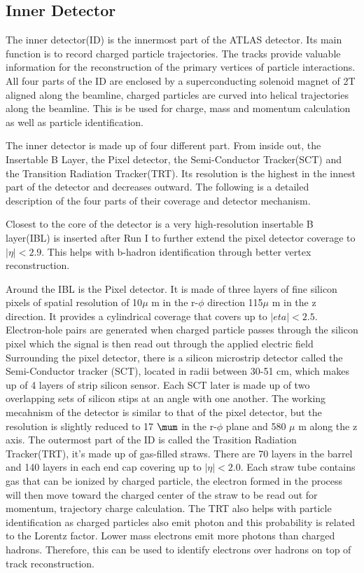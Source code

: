\subsection{Inner Detector}
The inner detector(ID) is the innermost part of the ATLAS detector. Its main function is to record charged particle trajectories. The tracks provide valuable information for the reconstruction of the primary vertices of particle interactions. All four parts of the ID are enclosed by a superconducting solenoid magnet of 2T aligned along the beamline, charged particles are curved into helical trajectories along the beamline. This is be used for charge, mass and momentum calculation as well as particle
identification. 



The inner detector is made up of four different part. From inside out, the Insertable B Layer, the Pixel detector, the Semi-Conductor Tracker(SCT) and the Transition Radiation Tracker(TRT). 
Its resolution is the highest in the innest part of the detector and decreases outward. The following is a detailed description of the four parts of their coverage and detector mechanism. 

Closest to the core of the detector is a very high-resolution insertable B layer(IBL) is inserted after Run I to further extend the pixel detector coverage to $|\eta|< 2.9$. This helps with b-hadron identification through better vertex reconstruction.

Around the IBL is the Pixel detector. It is made of three layers of fine silicon pixels of spatial resolution of 10$\mu$ m in the r-$\phi$ direction 115$\mu$ m in the z direction. It provides a cylindrical coverage that covers up to $|eta|<2.5$. Electron-hole pairs are generated when charged particle passes through the silicon pixel which the signal is then read out through the applied electric field
Surrounding the pixel detector, there is a silicon microstrip detector called the Semi-Conductor tracker (SCT), located in radii between 30-51 cm, which makes up of 4 layers of strip silicon sensor. Each SCT later is made up of two overlapping sets of silicon stips at an angle with one another. The working mecahnism of the detector is similar to that of the pixel detector, but the resolution is slightly reduced to 17 $\mum$ in the r-$\phi$ plane and 580 $\mu$ m along the z axis. 
The outermost part of the ID is called the Trasition Radiation Tracker(TRT), it's made up of gas-filled straws. There are 70 layers in the barrel and 140 layers in each end cap covering up to $|\eta|<2.0$. Each straw tube contains gas that can be ionized by charged particle, the electron formed in the process will then move toward the charged center of the straw to be read out for momentum, trajectory charge calculation. The TRT also helps with particle identification as charged particles also
emit photon and this probability is related to the Lorentz factor. Lower mass electrons emit more photons than charged hadrons. Therefore, this can be used to identify electrons over hadrons on top of track reconstruction. 

